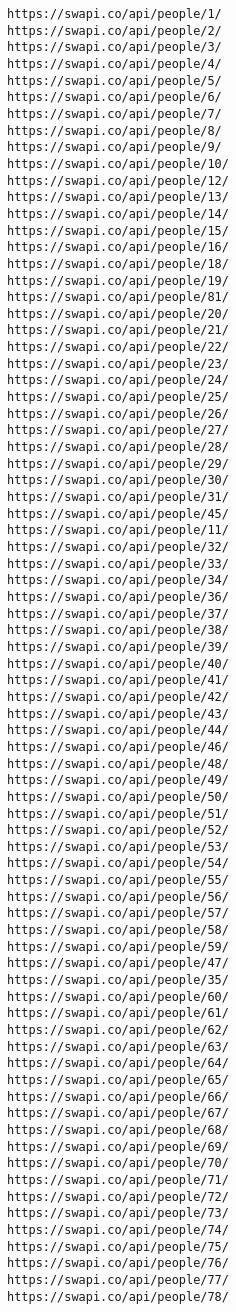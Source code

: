 \documentclass[11pt]{article}
\begin{document}
    \begin{Verbatim}[commandchars=\\\{\}]
https://swapi.co/api/people/1/
https://swapi.co/api/people/2/
https://swapi.co/api/people/3/
https://swapi.co/api/people/4/
https://swapi.co/api/people/5/
https://swapi.co/api/people/6/
https://swapi.co/api/people/7/
https://swapi.co/api/people/8/
https://swapi.co/api/people/9/
https://swapi.co/api/people/10/
https://swapi.co/api/people/12/
https://swapi.co/api/people/13/
https://swapi.co/api/people/14/
https://swapi.co/api/people/15/
https://swapi.co/api/people/16/
https://swapi.co/api/people/18/
https://swapi.co/api/people/19/
https://swapi.co/api/people/81/
https://swapi.co/api/people/20/
https://swapi.co/api/people/21/
https://swapi.co/api/people/22/
https://swapi.co/api/people/23/
https://swapi.co/api/people/24/
https://swapi.co/api/people/25/
https://swapi.co/api/people/26/
https://swapi.co/api/people/27/
https://swapi.co/api/people/28/
https://swapi.co/api/people/29/
https://swapi.co/api/people/30/
https://swapi.co/api/people/31/
https://swapi.co/api/people/45/
https://swapi.co/api/people/11/
https://swapi.co/api/people/32/
https://swapi.co/api/people/33/
https://swapi.co/api/people/34/
https://swapi.co/api/people/36/
https://swapi.co/api/people/37/
https://swapi.co/api/people/38/
https://swapi.co/api/people/39/
https://swapi.co/api/people/40/
https://swapi.co/api/people/41/
https://swapi.co/api/people/42/
https://swapi.co/api/people/43/
https://swapi.co/api/people/44/
https://swapi.co/api/people/46/
https://swapi.co/api/people/48/
https://swapi.co/api/people/49/
https://swapi.co/api/people/50/
https://swapi.co/api/people/51/
https://swapi.co/api/people/52/
https://swapi.co/api/people/53/
https://swapi.co/api/people/54/
https://swapi.co/api/people/55/
https://swapi.co/api/people/56/
https://swapi.co/api/people/57/
https://swapi.co/api/people/58/
https://swapi.co/api/people/59/
https://swapi.co/api/people/47/
https://swapi.co/api/people/35/
https://swapi.co/api/people/60/
https://swapi.co/api/people/61/
https://swapi.co/api/people/62/
https://swapi.co/api/people/63/
https://swapi.co/api/people/64/
https://swapi.co/api/people/65/
https://swapi.co/api/people/66/
https://swapi.co/api/people/67/
https://swapi.co/api/people/68/
https://swapi.co/api/people/69/
https://swapi.co/api/people/70/
https://swapi.co/api/people/71/
https://swapi.co/api/people/72/
https://swapi.co/api/people/73/
https://swapi.co/api/people/74/
https://swapi.co/api/people/75/
https://swapi.co/api/people/76/
https://swapi.co/api/people/77/
https://swapi.co/api/people/78/

\end{Verbatim}
\end{document}
